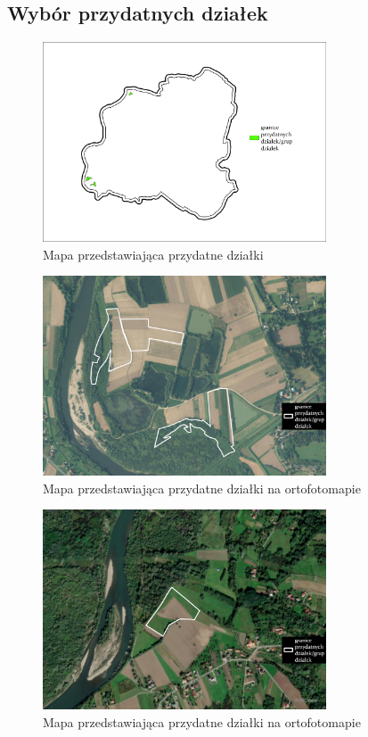 \documentclass{article}
\begin{document}
\subsection{Wybór przydatnych działek}

\begin{figure}[H]
    \centering
    \includegraphics[width=0.75\textwidth]{img/plesna-przydatne-dzialki.jpg}
    \caption*{Mapa przedstawiająca przydatne działki}
\end{figure}

\begin{figure}[H]
    \centering
    \includegraphics[width=0.75\textwidth]{img/plesna-dzialki-przydatne-ortofoto.jpg}
    \caption*{Mapa przedstawiająca przydatne działki na ortofotomapie}
\end{figure}

\begin{figure}[H]
    \centering
    \includegraphics[width=0.75\textwidth]{img/plesna-dzialki-przydatne-ortofoto-2.jpg}
    \caption*{Mapa przedstawiająca przydatne działki na ortofotomapie}
\end{figure}
\end{document}
